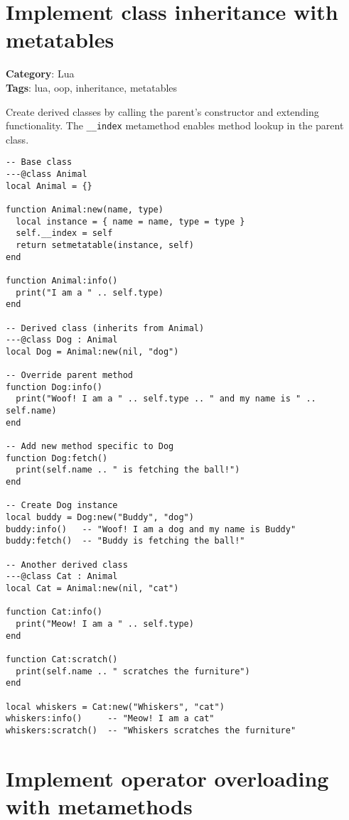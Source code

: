 {{{{{{\section{Implement class inheritance with metatables}

\textbf{Category}: Lua\\ \textbf{Tags}: lua, oop, inheritance, metatables
\vspace{0.5cm}

Create derived classes by calling the parent's constructor and extending functionality. The {\footnotesize \Verb§__index§} metamethod enables method lookup in the parent class.

\begin{Exa*}{}
\begin{Verbatim}[fontsize=\footnotesize, breaklines, breakanywhere]
-- Base class
---@class Animal
local Animal = {}

function Animal:new(name, type)
  local instance = { name = name, type = type }
  self.__index = self
  return setmetatable(instance, self)
end

function Animal:info()
  print("I am a " .. self.type)
end

-- Derived class (inherits from Animal)
---@class Dog : Animal
local Dog = Animal:new(nil, "dog")

-- Override parent method
function Dog:info()
  print("Woof! I am a " .. self.type .. " and my name is " .. self.name)
end

-- Add new method specific to Dog
function Dog:fetch()
  print(self.name .. " is fetching the ball!")
end

-- Create Dog instance
local buddy = Dog:new("Buddy", "dog")
buddy:info()   -- "Woof! I am a dog and my name is Buddy"
buddy:fetch()  -- "Buddy is fetching the ball!"

-- Another derived class
---@class Cat : Animal
local Cat = Animal:new(nil, "cat")

function Cat:info()
  print("Meow! I am a " .. self.type)
end

function Cat:scratch()
  print(self.name .. " scratches the furniture")
end

local whiskers = Cat:new("Whiskers", "cat")
whiskers:info()     -- "Meow! I am a cat"
whiskers:scratch()  -- "Whiskers scratches the furniture"
\end{Verbatim}
\end{Exa*}

\section{Implement operator overloading with metamethods}

}}}}}}
